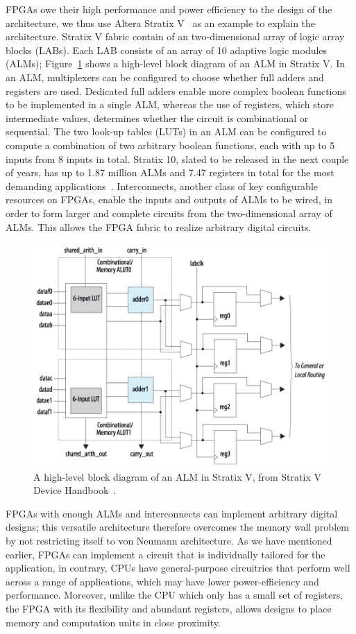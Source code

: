 FPGAs owe their high performance and power efficiency to the design of the
architecture, we thus use Altera Stratix V~\cite{stratix5} as an example to
explain the architecture.  Stratix V fabric contain of an two-dimensional array
of logic array blocks (LABs).  Each LAB consists of an array of 10 adaptive
logic modules (ALMs); Figure~\ref{bg:fig:alm} shows a high-level block diagram
of an ALM in Stratix V.  In an ALM, multiplexers can be configured to choose
whether full adders and registers are used.  Dedicated full adders enable more
complex boolean functions to be implemented in a single ALM, whereas the use of
registers, which store intermediate values, determines whether the circuit is
combinational or sequential.  The two look-up tables (LUTs) in an ALM can be
configured to compute a combination of two arbitrary boolean functions, each
with up to 5 inputs from 8 inputs in total.  Stratix 10, slated to be released
in the next couple of years, has up to 1.87 million ALMs and 7.47 registers in
total for the most demanding applications~\cite{stratix10stat}.  Interconnects,
another class of key configurable resources on FPGAs, enable the inputs and
outputs of ALMs to be wired, in order to form larger and complete circuits from
the two-dimensional array of ALMs.  This allows the FPGA fabric to realize
arbitrary digital circuits.
\begin{figure}[ht]
    \centering
    \includegraphics[width=0.8\linewidth]{bg/fig/alm.png}
    \caption{%
        A high-level block diagram of an ALM in Stratix V, from Stratix V
        Device Handbook~\cite{stratix5}.
    }\label{bg:fig:alm}
\end{figure}


FPGAs with enough ALMs and interconnects can implement arbitrary digital
designs; this versatile architecture therefore overcomes the memory wall
problem by not restricting itself to von Neumann architecture.  As we have
mentioned earlier, FPGAs can implement a circuit that is individually tailored
for the application, in contrary, CPUs have general-purpose circuitries
that perform well across a range of applications, which may have lower
power-efficiency and performance.  Moreover, unlike the CPU which only has a
small set of registers, the FPGA with its flexibility and abundant registers,
allows designs to place memory and computation units in close proximity.

